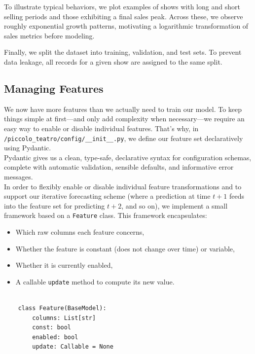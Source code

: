 \documentclass[a4paper,12pt]{report}  %
\begin{document}
To illustrate typical behaviors, we plot examples of shows with long and short selling periods and those exhibiting a final sales peak. Across these, we observe roughly exponential growth patterns, motivating a logarithmic transformation of sales metrics before modeling.


Finally, we split the dataset into training, validation, and test sets. To prevent data leakage, all records for a given show are assigned to the same split.


\subsection{Managing Features}
We now have more features than we actually need to train our model.
To keep things simple at first—and only add complexity when necessary—we require an easy way to
enable or disable individual features.
That’s why, in \verb|/piccolo_teatro/config/__init__.py|, we define our feature set declaratively using Pydantic.\\

Pydantic gives us a clean, type-safe, declarative syntax for configuration schemas,
complete with automatic validation, sensible defaults, and informative error messages.\\

In order to flexibly enable or disable individual feature transformations and to support our iterative forecasting scheme (where a prediction at time \(t+1\) feeds into the feature set for predicting \(t+2\), and so on), we implement a small framework based on a \texttt{Feature} class. This framework encapsulates:

\begin{itemize}
	\item Which raw columns each feature concerns,
	\item Whether the feature is constant (does not change over time) or variable,
	\item Whether it is currently enabled,
	\item A callable \texttt{update} method to compute its new value.
\end{itemize}

\clearpage
\begin{verbatim}

    class Feature(BaseModel):
        columns: List[str]
        const: bool
        enabled: bool
        update: Callable = None

    \end{verbatim}
\end{document}
